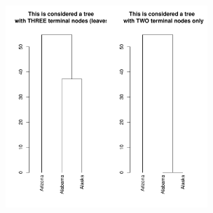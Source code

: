 \documentclass[shortnames,nojss,article]{jss}\usepackage{graphicx, color}
\makeatletter
\def\maxwidth{ %
  \ifdim\Gin@nat@width>\linewidth
    \linewidth
  \else
    \Gin@nat@width
  \fi
}
\newenvironment{knitrout}{}{} %
\makeatother
\begin{document}
\begin{knitrout}
{\centering \includegraphics[width=\maxwidth,height=3in]{figure/unnamed-chunk-19} 

}



\end{knitrout}





% 
% 
% 
% 
% 
%   
%   
% 
% 

\end{document}
